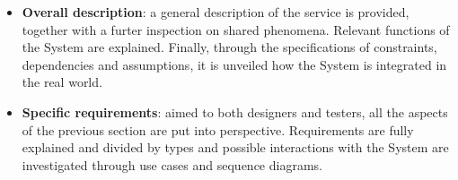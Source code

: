 \begin{itemize}

\item \textbf{Overall description}: a general description of the service is provided, together with a furter inspection on shared phenomena. Relevant functions of the System are explained. Finally, through the specifications of constraints, dependencies and assumptions, it is unveiled how the System is integrated in the real world.

\item \textbf{Specific requirements}: aimed to both designers and testers, all the aspects of the previous section are put into perspective. Requirements
are fully explained and divided by types and possible interactions with the System are investigated through use cases and sequence diagrams.

\end{itemize}
